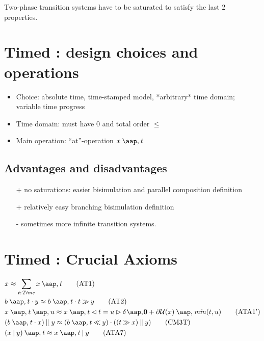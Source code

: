 \begin{slide}
\pause
Two-phase transition systems have to be saturated to satisfy the last 2 properties.
\newslide\section*{Timed \mcrl: design choices and operations}
\begin{itemize}
\item Choice: absolute time, time-stamped model, *arbitrary* time domain; variable time progress
\item Time domain: must have $0$ and total order $\leq$
\item Main operation: ``at''-operation $x\at t$
\end{itemize}
\pause
\subsection*{Advantages and disadvantages}
\begin{itemize}
\item[+] no saturations: easier bisimulation and parallel composition definition
\item[+] relatively easy branching bisimulation definition
\item[-] sometimes more infinite transition systems.
\end{itemize}
\newslide\section*{Timed \mcrl: Crucial Axioms}
\vspace{-1.5ex}
\begin{footnotesize}
  \begin{align}
&  x\id \sum_{t\ap\Time}x\at t\tag{AT1}\label{eq:AT1}\\ %
&  b\at t\seqc y\id b\at t\seqc t\ti y\tag{AT2}\label{eq:AT2}\\ %
&  x\at t\at u\id x\at t\lcond t=u\rcond\daz+\udd(x)\at\nm{min}(t,u)\tag{ATA1$'$}\label{eq:ATA1'}\\ %
&  (b\at t\seqc x)\leftm y\id (b\at t\tb y)\seqc((t\ti x)\parc y)\tag{CM3T}\label{eq:CM3T}\\
&  (x\comm y)\at t\id x\at t\comm y\tag{ATA7}\label{eq:ATA7}\\

\end{align}
\end{footnotesize}
\end{slide}
